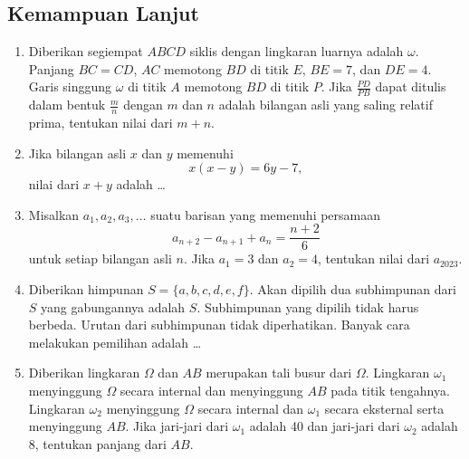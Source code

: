 \subsection{Kemampuan Lanjut}
\begin{enumerate}[resume]
\item Diberikan segiempat $ABCD$ siklis dengan lingkaran luarnya adalah $\omega$. Panjang $BC=CD$, $AC$ memotong $BD$ di titik $E$, $BE=7$, dan $DE=4$. Garis singgung $\omega$ di titik $A$ memotong $BD$ di titik $P$. Jika $\frac{PD}{PB}$ dapat ditulis dalam bentuk $\frac{m}{n}$ dengan $m$ dan $n$ adalah bilangan asli yang saling relatif prima, tentukan nilai dari $m+n$.

\item Jika bilangan asli $x$ dan $y$ memenuhi
$$x(x-y)=6y-7,$$
nilai dari $x+y$ adalah \dots

\item Misalkan $a_1,a_2,a_3,\dots$ suatu barisan yang memenuhi persamaan
$$a_{n+2}-a_{n+1}+a_{n}=\dfrac{n+2}{6}$$
untuk setiap bilangan asli $n$. Jika $a_1=3$ dan $a_2=4$, tentukan nilai dari $a_{2023}$.

\item Diberikan himpunan $S = \{a,b,c,d,e,f\}$. Akan dipilih dua subhimpunan dari $S$ yang gabungannya adalah $S$. Subhimpunan yang dipilih tidak harus berbeda. Urutan dari subhimpunan tidak diperhatikan. Banyak cara melakukan pemilihan adalah \dots

\item Diberikan lingkaran $\Omega$ dan $AB$ merupakan tali busur dari $\Omega$. Lingkaran $\omega_1$ menyinggung $\Omega$ secara internal dan menyinggung $AB$ pada titik tengahnya. Lingkaran $\omega_2$ menyinggung $\Omega$ secara internal dan $\omega_1$ secara eksternal serta menyinggung $AB$. Jika jari-jari dari $\omega_1$ adalah 40 dan jari-jari dari $\omega_2$ adalah 8, tentukan panjang dari $AB$.
\begin{center}
\end{center}


\end{enumerate}
